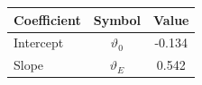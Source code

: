 \begin{tabular}{lcc}
\hline\hline
Coefficient & Symbol & Value \\
\hline
Intercept & $\vartheta_0$ & -0.134 \\
Slope & $\vartheta_E$ & 0.542 \\
\hline
\end{tabular}